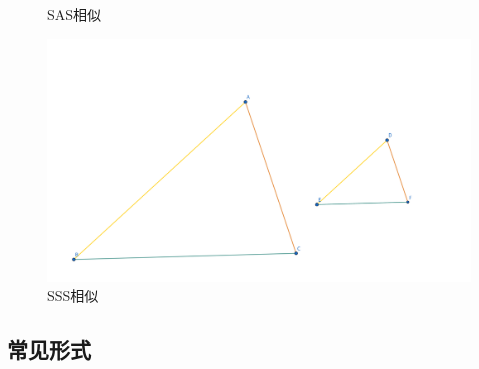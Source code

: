 \begin{figure}[H]
\begin{minipage}[t]{0.3\textwidth}
    \caption{SAS相似}
    \end{minipage}
    \begin{minipage}[t]{0.3\textwidth}
    \centering
    \includegraphics[width=\linewidth]{figures/SSS相似.png}
    \caption{SSS相似}
    \end{minipage}
\end{figure}












\subsection{常见形式}


